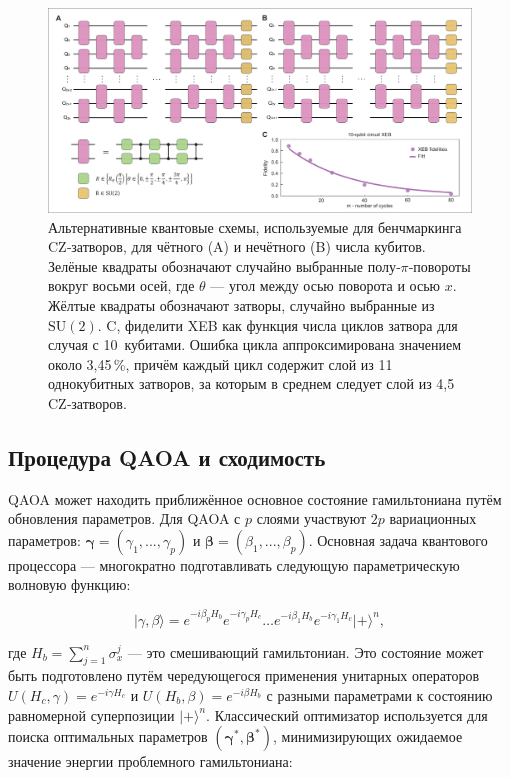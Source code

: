 \begin{figure}
    \centering
    \includegraphics[scale=0.35]{inc/fig_05.png}
    \caption{
    Альтернативные квантовые схемы, используемые для бенчмаркинга CZ‑затворов,
    для чётного (A) и нечётного (B) числа кубитов. Зелёные квадраты обозначают
    случайно выбранные полу‑$\pi$‑повороты вокруг восьми осей, где $\theta$ —
    угол между осью поворота и осью $x$. Жёлтые квадраты обозначают затворы,
    случайно выбранные из $\mathrm{SU}(2)$. C, фиделити XEB как функция числа
    циклов затвора для случая с 10 кубитами. Ошибка цикла аппроксимирована
    значением около 3{,}45\,\%, причём каждый цикл содержит слой из 11
    однокубитных затворов, за которым в среднем следует слой из 4{,}5
    CZ‑затворов.
    }
    \label{fig:fig05}
\end{figure}

\subsection*{Процедура QAOA и сходимость}

QAOA может находить приближённое основное состояние гамильтониана путём
обновления параметров. Для QAOA с $p$ слоями участвуют $2p$ вариационных
параметров: $\boldsymbol{\gamma} = (\gamma_1, ..., \gamma_p)$ и
$\boldsymbol{\beta} = (\beta_1, ..., \beta_p)$. Основная задача квантового
процессора — многократно подготавливать следующую параметрическую волновую
функцию:

\begin{equation}
\lvert \gamma, \beta \rangle
      = e^{-i\beta_{p} H_{b}}
        e^{-i\gamma_{p} H_{c}}
        \dots
        e^{-i\beta_{1} H_{b}}
        e^{-i\gamma_{1} H_{c}}
        \lvert + \rangle^{n},
\end{equation}

где $H_b = \sum_{j=1}^{n} \sigma_x^j$ — это смешивающий гамильтониан. Это
состояние может быть подготовлено путём чередующегося применения унитарных
операторов $U(H_c, \gamma) = e^{-i\gamma H_c}$ и $U(H_b, \beta) = e^{-i\beta
H_b}$ с разными параметрами к состоянию равномерной суперпозиции $\lvert +
\rangle^{n}$. Классический оптимизатор используется для поиска оптимальных
параметров $(\boldsymbol{\gamma}^*, \boldsymbol{\beta}^*)$, минимизирующих
ожидаемое значение энергии проблемного гамильтониана:

